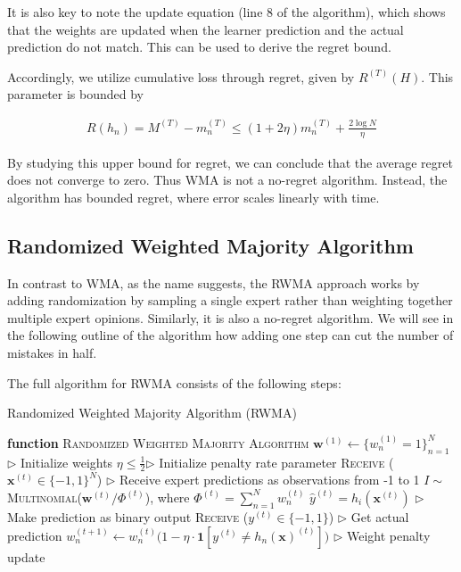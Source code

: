 \documentclass[11pt]{article}
\begin{document}
It is also key to note the update equation (line 8 of the algorithm), which shows that the weights are updated when the learner prediction and the actual prediction do not match. This can be used to derive the regret bound.

Accordingly, we utilize cumulative loss through regret, given by $R^{(T)}(H)$. This parameter is bounded by 

\begin{align}
    R(h_n) = M^{(T)} - m_n^{(T)} \leq (1+2\eta) m_n^{(T)} + \frac{2\log N}{\eta}
\end{align}

By studying this upper bound for regret, we can conclude that the average regret does not converge to zero. Thus WMA is not a no-regret algorithm. Instead, the algorithm has bounded regret, where error scales linearly with time.

\subsection{Randomized Weighted Majority Algorithm}

In contrast to WMA, as the name suggests, the RWMA approach works by adding randomization by sampling a single expert rather than weighting together multiple expert opinions. Similarly, it is also a no-regret algorithm. We will see in the following outline of the algorithm how adding one step can cut the number of mistakes in half.

The full algorithm for RWMA consists of the following steps:

\begin{algorithm}[H]
\caption{Randomized Weighted Majority Algorithm (RWMA)}
\label{algo:rwma}
\begin{algorithmic}[1]
\STATE \textbf{function} \textsc{Randomized Weighted Majority Algorithm}
\STATE $\textbf{w}^{(1)} \leftarrow \{w_n^{(1)}=1\}_{n=1}^N$ \hfill $\triangleright$ Initialize weights
\STATE $\eta\leq\frac{1}{2}$\hfill $\triangleright$ Initialize penalty rate parameter
\STATE \textsc{Receive} ($\textbf{x}^{(t)}\in\{-1, 1\}^N$) \hfill $\triangleright$ Receive expert predictions as observations from -1 to 1
\STATE $I\sim$ \textsc{Multinomial}($\textbf{w}^{(t)}/\Phi^{(t)}$), where $\Phi^{(t)}=\sum_{n=1}^Nw_n^{(t)}$
\STATE $\hat{y}^{(t)}=h_i(\textbf{x}^{(t)})$ \hfill $\triangleright$ Make prediction as binary output
\STATE \textsc{Receive} ($y^{(t)}\in\{-1, 1\}$) \hfill $\triangleright$ Get actual prediction
\STATE $w_n^{(t+1)}\leftarrow w_n^{(t)}\big(1-\eta\cdot\textbf{1}[y^{(t)}\neq h_n(\textbf{x})^{(t)}]\big)$ \hfill $\triangleright$ Weight penalty update
\ENDFOR
\end{algorithmic}
\end{algorithm}
\end{document}
